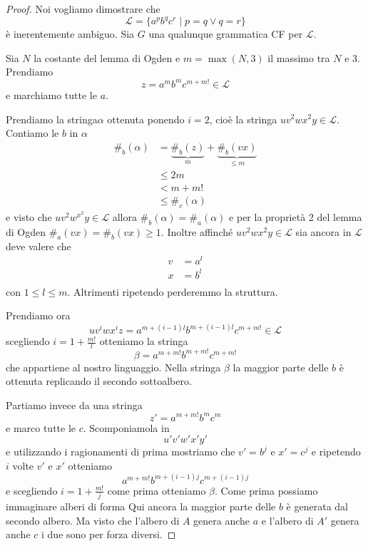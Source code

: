 \documentclass[12pt]{article}
\begin{document}
\begin{proof}
	Noi vogliamo dimostrare che
	$$ \mathcal{L} = \{ a^p b^q c^r \mid p = q \vee q = r \} $$
	è inerentemente ambiguo.
	Sia $G$ una qualunque grammatica CF per $\mathcal{L}$.

	Sia $N$ la costante del lemma di Ogden e $m = \max(N, 3) $ il massimo tra $N$ e 3.
	Prendiamo 
	$$ z = a^m b^m c^{m + m!} \in \mathcal{L}$$
	e marchiamo tutte le $a$.

	Prendiamo la stringa$\alpha$ ottenuta ponendo $i = 2$, cioè la stringa $u v^2 w x^2 y \in \mathcal{L}$.
	Contiamo le $b$ in $\alpha$
	\begin{align*}
		\#_b(\alpha) &= \underbrace{\#_b(z)}_{m} + \underbrace{\#_b(vx)}_{\leq m} \\
		&\leq 2m \\ 
		&< m + m! \tag{Visto che $m$ è almeno 3} \\
		&\leq \#_c(\alpha) \tag{Le $c$ rimaste sono almeno quelle che c'erano prima}
	\end{align*}
	e visto che $uv^2 w^{x^2} y \in \mathcal{L}$ allora $\#_b(\alpha) = \#_a(\alpha)$ e per la proprietà 2 del lemma di Ogden $\#_a(vx) = \#_b(vx) \geq 1$.
	Inoltre affinché $u v^2 w x^2 y \in \mathcal{L}$ sia ancora in $\mathcal{L}$ deve valere che
	\begin{align*}
		v &= a^l \\
		x &= b^l \\
	\end{align*}
	con $1 \leq l \leq m$.
	Altrimenti ripetendo perderemmo la struttura.

	Prendiamo ora
	$$ u v^i w x^i z = a^{m + (i - 1)l}b^{m + (i - 1)l} c^{m + m!} \in \mathcal{L} $$
	scegliendo $i = 1 + \frac{m!}{l}$ otteniamo la stringa 
	$$ \beta = a^{m + m!} b^{m + m!} c^{m + m!} $$
	che appartiene al nostro linguaggio.
	Nella stringa $\beta$ la maggior parte delle $b$ è ottenuta replicando il secondo sottoalbero.

	Partiamo invece da una stringa
	$$ z' = a^{m + m!} b^m c^m $$
	e marco tutte le $c$.
	Scomponiamola in
	$$ u' v' w' x' y' $$
	e utilizzando i ragionamenti di prima mostriamo che $v' = b^j$ e $x' = c^j$ e ripetendo $i$ volte $v'$ e $x'$ otteniamo
	$$ a^{m + m!} b^{m + (i - 1)j} c^{m + (i - 1)j} $$
	e scegliendo $i = 1 + \frac{m!}{j}$ come prima otteniamo $\beta$.
	Come prima possiamo immaginare alberi di forma
	Qui ancora la maggior parte delle $b$ è generata dal secondo albero.
	Ma visto che l'albero di $A$ genera anche $a$ e l'albero di $A'$ genera anche $c$ i due sono per forza diversi.
\end{proof}
\end{document}
